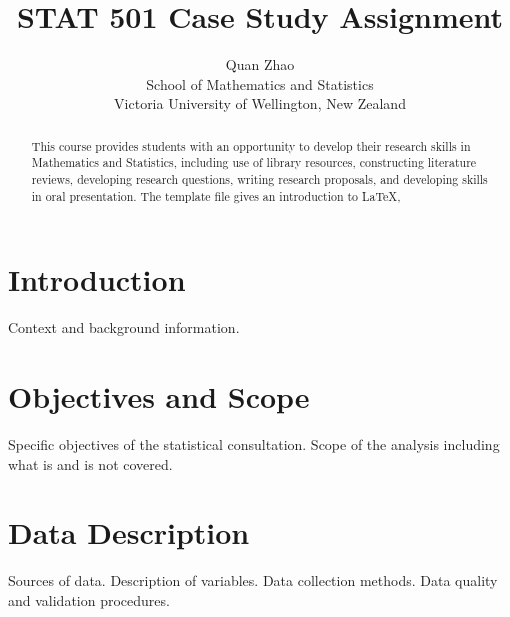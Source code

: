 \documentclass[12pt]{article}
\title{STAT 501 Case Study Assignment}
\author{Quan Zhao\\
School of Mathematics and Statistics\\ Victoria University of Wellington, New Zealand}
\begin{document}
\maketitle

\begin{abstract}
  This course provides students with an opportunity to develop their
  research skills in Mathematics and Statistics, including use of
  library resources, constructing literature reviews, developing
  research questions, writing research proposals, and developing
  skills in oral presentation. The template file gives an introduction
  to LaTeX,
\end{abstract}


\tableofcontents


\setlength{\baselineskip}{0.25in} %





\newpage  %
\section{Introduction}

\label{s.intro}

Context and background information.
\cite{Liu05}

\section{Objectives and Scope}

Specific objectives of the statistical consultation.
Scope of the analysis including what is and is not covered.



\section{Data Description}

Sources of data.
Description of variables.
Data collection methods.
Data quality and validation procedures.
\end{document}
